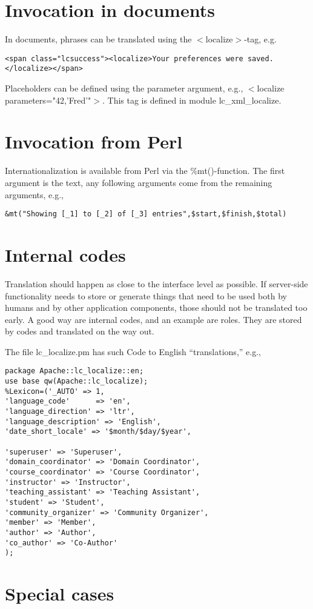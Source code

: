 \section{Invocation in documents}
In documents, phrases can be translated using the $<$localize$>$-tag, e.g.
\begin{verbatim}
<span class="lcsuccess"><localize>Your preferences were saved.</localize></span>
\end{verbatim}
Placeholders can be defined using the parameter argument, e.g., $<$localize parameters="42,'Fred'"$>$.
This tag is defined in module lc\_xml\_localize.
\section{Invocation from Perl}
Internationalization is available from Perl via the \%mt()-function. The first argument is the text, any following arguments come from the remaining arguments, e.g., 
\begin{verbatim}
&mt("Showing [_1] to [_2] of [_3] entries",$start,$finish,$total)
\end{verbatim}
\section{Internal codes}
Translation should happen as close to the interface level as possible. If server-side functionality needs to store or generate things that need to be used both by humans and by other application components, those should not be translated too early. A good way are internal codes, and an example are roles. They are stored by codes and translated on the way out.

The file lc\_localize.pm has such Code to English ``translations,'' e.g.,
\begin{verbatim}
package Apache::lc_localize::en;
use base qw(Apache::lc_localize);
%Lexicon=('_AUTO' => 1, 
'language_code'      => 'en',
'language_direction' => 'ltr',
'language_description' => 'English',
'date_short_locale' => '$month/$day/$year',

'superuser' => 'Superuser',
'domain_coordinator' => 'Domain Coordinator',
'course_coordinator' => 'Course Coordinator',
'instructor' => 'Instructor',
'teaching_assistant' => 'Teaching Assistant',
'student' => 'Student',
'community_organizer' => 'Community Organizer',
'member' => 'Member',
'author' => 'Author',
'co_author' => 'Co-Author'
);
\end{verbatim}
\section{Special cases}
